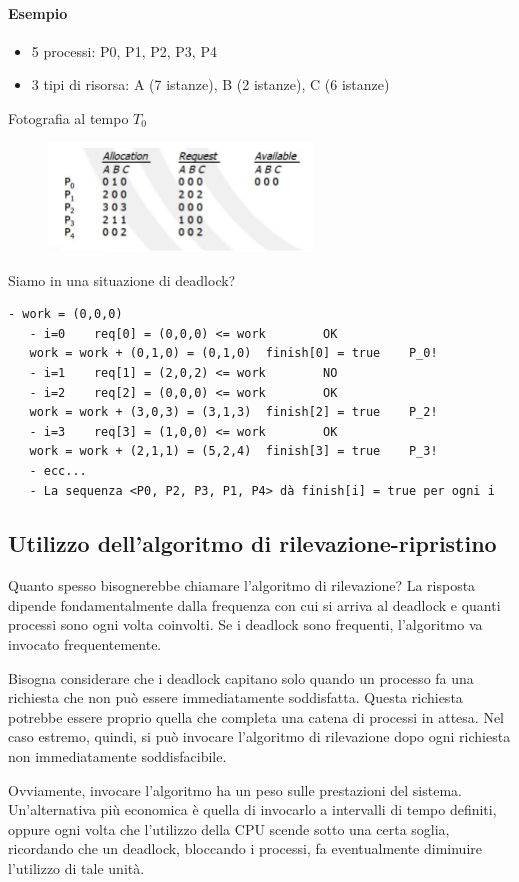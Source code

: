 \documentclass[a4paper]{article}
\begin{document}
\paragraph{Esempio}
\begin{itemize}
   \item 5 processi: P0, P1, P2, P3, P4
   \item 3 tipi di risorsa: A (7 istanze), B (2 istanze), C (6 istanze)
\end{itemize}
Fotografia al tempo $T_0$
\begin{figure}[htb]
   \includegraphics[width=7cm]{img/ril1.JPG}
\end{figure}
\newpage
Siamo in una situazione di deadlock?
\begin{Verbatim}[tabsize=3]
   - work = (0,0,0)
   - i=0	req[0] = (0,0,0) <= work 		OK
   work = work + (0,1,0) = (0,1,0)	finish[0] = true	P_0!
   - i=1	req[1] = (2,0,2) <= work		NO
   - i=2	req[2] = (0,0,0) <= work 		OK
   work = work + (3,0,3) = (3,1,3)	finish[2] = true	P_2!
   - i=3	req[3] = (1,0,0) <= work 		OK
   work = work + (2,1,1) = (5,2,4)	finish[3] = true	P_3!
   - ecc...
   - La sequenza <P0, P2, P3, P1, P4> dà finish[i] = true per ogni i
\end{Verbatim}

\subsection{Utilizzo dell'algoritmo di rilevazione-ripristino}
Quanto spesso bisognerebbe chiamare l'algoritmo di rilevazione? La risposta dipende fondamentalmente dalla frequenza con cui si arriva al deadlock e quanti processi sono ogni volta coinvolti. Se i deadlock sono frequenti, l'algoritmo va invocato frequentemente.

Bisogna considerare che i deadlock capitano solo quando un processo fa una richiesta che non può essere immediatamente soddisfatta. Questa richiesta potrebbe essere proprio quella che completa una catena di processi in attesa. Nel caso estremo, quindi, si può invocare l'algoritmo di rilevazione dopo ogni richiesta non immediatamente soddisfacibile.

Ovviamente, invocare l'algoritmo ha un peso sulle prestazioni del sistema. Un'alternativa più economica è quella di invocarlo a intervalli di tempo definiti, oppure ogni volta che l'utilizzo della CPU scende sotto una certa soglia, ricordando che un deadlock, bloccando i processi, fa eventualmente diminuire l'utilizzo di tale unità.
\end{document}

